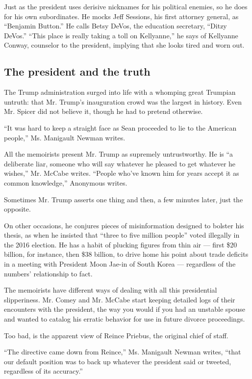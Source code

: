 Just as the president uses derisive nicknames for his political enemies,
so he does for his own subordinates. He mocks Jeff Sessions, his first
attorney general, as ``Benjamin Button.'' He calls Betsy DeVos, the
education secretary, ``Ditzy DeVos.'' ``This place is really taking a
toll on Kellyanne,'' he says of Kellyanne Conway, counselor to the
president, implying that she looks tired and worn out.

\hypertarget{the-president-and-the-truth}{%
\subsection{The president and the
truth}\label{the-president-and-the-truth}}

The Trump administration surged into life with a whomping great Trumpian
untruth: that Mr. Trump's inauguration crowd was the largest in history.
Even Mr. Spicer did not believe it, though he had to pretend otherwise.

``It was hard to keep a straight face as Sean proceeded to lie to the
American people,'' Ms. Manigault Newman writes.

All the memoirists present Mr. Trump as supremely untrustworthy. He is
``a deliberate liar, someone who will say whatever he pleased to get
whatever he wishes,'' Mr. McCabe writes. ``People who've known him for
years accept it as common knowledge,'' Anonymous writes.

Sometimes Mr. Trump asserts one thing and then, a few minutes later,
just the opposite.

On other occasions, he conjures pieces of misinformation designed to
bolster his thesis, as when he insisted that ``three to five million
people'' voted illegally in the 2016 election. He has a habit of
plucking figures from thin air --- first \$20 billion, for instance,
then \$38 billion, to drive home his point about trade deficits in a
meeting with President Moon Jae-in of South Korea --- regardless of the
numbers' relationship to fact.

The memoirists have different ways of dealing with all this presidential
slipperiness. Mr. Comey and Mr. McCabe start keeping detailed logs of
their encounters with the president, the way you would if you had an
unstable spouse and wanted to catalog his erratic behavior for use in
future divorce proceedings.

Too bad, is the apparent view of Reince Priebus, the original chief of
staff.

``The directive came down from Reince,'' Ms. Manigault Newman writes,
``that our default position was to back up whatever the president said
or tweeted, regardless of its accuracy.''

